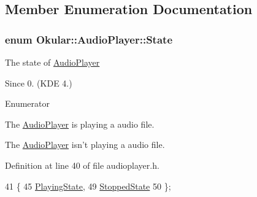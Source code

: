 \subsection{Member Enumeration Documentation}
\hypertarget{classOkular_1_1AudioPlayer_ab4aec223fcb227ab5cee9c525f6c5d6e}{
\subsubsection[{State}]{\setlength{\rightskip}{0pt plus 5cm}enum {\bf Okular\+::\+Audio\+Player\+::\+State}}}\label{classOkular_1_1AudioPlayer_ab4aec223fcb227ab5cee9c525f6c5d6e}
The state of \hyperlink{classOkular_1_1AudioPlayer}{Audio\+Player} \begin{DoxySince}{Since}
0. (K\+D\+E 4.) 
\end{DoxySince}
\begin{Desc}
\item[Enumerator]\par
\begin{description}
\item[{\em 
\hypertarget{classOkular_1_1AudioPlayer_ab4aec223fcb227ab5cee9c525f6c5d6eab5ce6ae3e434b775cda810ad636ff4fc}{Playing\+State}\label{classOkular_1_1AudioPlayer_ab4aec223fcb227ab5cee9c525f6c5d6eab5ce6ae3e434b775cda810ad636ff4fc}
}]The \hyperlink{classOkular_1_1AudioPlayer}{Audio\+Player} is playing a audio file. \item[{\em 
\hypertarget{classOkular_1_1AudioPlayer_ab4aec223fcb227ab5cee9c525f6c5d6ea8aff55f41e3daefa1c9a2268d7df5c3b}{Stopped\+State}\label{classOkular_1_1AudioPlayer_ab4aec223fcb227ab5cee9c525f6c5d6ea8aff55f41e3daefa1c9a2268d7df5c3b}
}]The \hyperlink{classOkular_1_1AudioPlayer}{Audio\+Player} isn't playing a audio file. \end{description}
\end{Desc}


Definition at line 40 of file audioplayer.\+h.


\begin{DoxyCode}
41         \{
45             \hyperlink{classOkular_1_1AudioPlayer_ab4aec223fcb227ab5cee9c525f6c5d6eab5ce6ae3e434b775cda810ad636ff4fc}{PlayingState},
49         \hyperlink{classOkular_1_1AudioPlayer_ab4aec223fcb227ab5cee9c525f6c5d6ea8aff55f41e3daefa1c9a2268d7df5c3b}{StoppedState}
50     \};
\end{DoxyCode}


